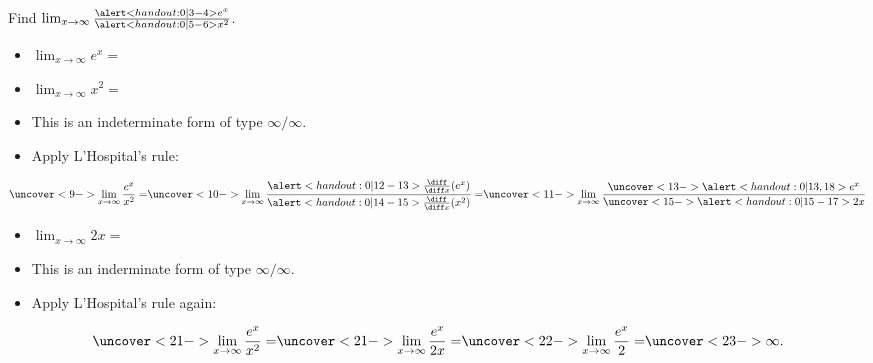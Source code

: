\begin{frame}
\begin{example}[Example 2, p. 473]
Find $\lim_{x\rightarrow \infty}\frac{\alert<handout:0| 3-4>{e^x}}{\alert<handout:0| 5-6>{x^2}}$.
\begin{itemize}
\item<2-| alert@3-4,18>  $\lim_{x\rightarrow \infty} e^x = $ 
\item<2-| alert@5-6>  $\lim_{x\rightarrow \infty} x^2 = $ 
\item<7->  This is an indeterminate form of type $\infty /\infty$.
\item<8->  Apply L'Hospital's rule:
\end{itemize}
\abovedisplayskip=0pt
\belowdisplayskip=0pt
\[
\uncover<9->{%
\lim_{x\rightarrow \infty} \frac{e^x}{x^2} = %
}%
\uncover<10->{%
\lim_{x\rightarrow \infty} \frac{\alert<handout:0| 12-13>{\frac{\diff}{\diff x} (e^x)}}{\alert<handout:0| 14-15>{\frac{\diff}{\diff x} (x^2)}} = %
}%
\uncover<11->{%
\lim_{x\rightarrow \infty} \frac{\uncover<13->{\alert<handout:0| 13,18>{e^x}}}{\uncover<15->{\alert<handout:0| 15-17>{2x}}} %
}%
\]
\begin{itemize}
\item<16-| alert@16-17>  $\lim_{x\rightarrow \infty} 2x = $ 
\item<19->  This is an inderminate form of type $\infty /\infty$.
\item<20->  Apply L'Hospital's rule again:
\end{itemize}
\[
\uncover<21->{%
\lim_{x\rightarrow \infty} \frac{e^x}{x^2} = %
}%
\uncover<21->{%
\lim_{x\rightarrow \infty} \frac{e^x}{2x} = %
}%
\uncover<22->{%
\lim_{x\rightarrow \infty} \frac{e^x}{2} = %
}%
\uncover<23->{%
\infty .%
}%
\]
\end{example}
\end{frame}
